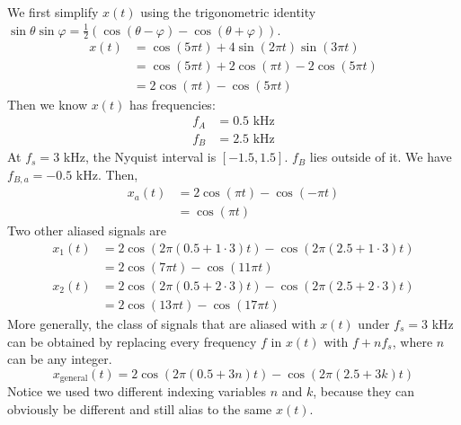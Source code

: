 \begin{itemize}
We first simplify $x(t)$ using the trigonometric identity
$\sin\theta\sin\varphi = \frac{1}{2}(\cos(\theta-\varphi)-\cos(\theta+\varphi))$.
\begin{align*}
	x(t) &= \cos(5\pi t) + 4\sin(2\pi t)\sin(3\pi t) \\
		 &= \cos(5\pi t) + 2\cos(\pi t) - 2\cos(5\pi t) \\
		 &= 2\cos(\pi t) - \cos(5\pi t)
\end{align*}
Then we know $x(t)$ has frequencies:
\begin{align*}
	f_A &= 0.5 \text{ kHz} \\
	f_B &= 2.5 \text{ kHz}
\end{align*}
At $f_s = 3$ kHz, the Nyquist interval is $[-1.5,1.5]$. $f_B$ lies outside of it.
We have $f_{B,a} = -0.5$ kHz. Then,
\begin{align*}
	x_a(t) &= 2\cos(\pi t) - \cos(-\pi t) \\
		   &= \cos(\pi t)
\end{align*}
Two other aliased signals are
\begin{align*}
	x_1(t) &= 2\cos(2\pi(0.5+1\cdot 3)t) - \cos(2\pi(2.5+1\cdot 3)t) \\
		   &= 2\cos(7\pi t) - \cos(11\pi t) \\
	x_2(t) &= 2\cos(2\pi(0.5+2\cdot 3)t) - \cos(2\pi(2.5+2\cdot 3)t) \\
		   &= 2\cos(13\pi t) - \cos(17\pi t)
\end{align*}
More generally, the class of signals that are aliased with $x(t)$ under
$f_s = 3$ kHz can be obtained by replacing every frequency $f$ in $x(t)$
with $f + nf_s$, where $n$ can be any integer.
\begin{equation*}
	x_{\text{general}}(t)
	= 2\cos(2\pi(0.5+3n)t) - \cos(2\pi(2.5+3k)t)
\end{equation*}
Notice we used two different indexing variables $n$ and $k$, because
they can obviously be different and still alias to the same $x(t)$.

\end{itemize}
